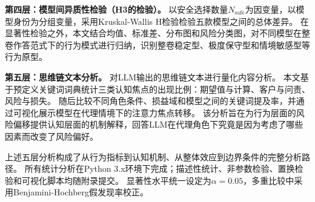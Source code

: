 \textbf{第四层：模型间异质性检验（H3的检验）。}
以安全选择数量$N_{\text{safe}}$为因变量，以模型身份为分组变量，采用Kruskal-Wallis H检验检验五款模型之间的总体差异。
在显著性检验之外，本文结合均值、标准差、分布图和风险分类图，对不同模型在整卷作答范式下的行为模式进行归纳，识别整卷稳定型、极度保守型和情境敏感型等行为原型。

\textbf{第五层：思维链文本分析。}
对LLM输出的思维链文本进行量化内容分析。
本文基于预定义关键词词典统计三类认知焦点的出现比例：期望值与计算、客户与问责、风险与损失。
随后比较不同角色条件、损益域和模型之间的关键词提及率，并通过可视化展示模型在代理情境下的注意力焦点转移。
该分析旨在为行为层面的风险偏移提供认知层面的机制解释，回答LLM在代理角色下究竟是因为考虑了哪些因素而改变了风险偏好。

上述五层分析构成了从行为指标到认知机制、从整体效应到边界条件的完整分析路径。
所有统计分析在Python 3.x环境下完成；描述性统计、非参数检验、置换检验和可视化脚本均随附录提交。
显著性水平统一设定为$\alpha = 0.05$，多重比较中采用Benjamini-Hochberg假发现率校正。
